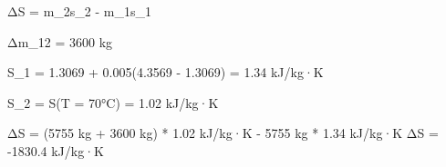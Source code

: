 ΔS = m_2s_2 - m_1s_1  

Δm_12 = 3600 kg  

S_1 = 1.3069 + 0.005(4.3569 - 1.3069) = 1.34 kJ/kg·K  

S_2 = S(T = 70°C) = 1.02 kJ/kg·K  

ΔS = (5755 kg + 3600 kg) * 1.02 kJ/kg·K - 5755 kg * 1.34 kJ/kg·K  
ΔS = -1830.4 kJ/kg·K